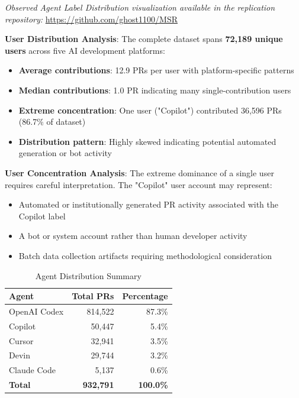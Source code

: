 \documentclass[conference]{IEEEtran}
\begin{document}
\noindent\textit{Observed Agent Label Distribution visualization available in the replication repository:} \url{https://github.com/ghost1100/MSR}

\textbf{User Distribution Analysis}: The complete dataset spans \textbf{72,189 unique users} across five AI development platforms:
\begin{itemize}
    \item \textbf{Average contributions}: 12.9 PRs per user with platform-specific patterns
    \item \textbf{Median contributions}: 1.0 PR indicating many single-contribution users  
    \item \textbf{Extreme concentration}: One user ("Copilot") contributed 36,596 PRs (86.7\% of dataset)
    \item \textbf{Distribution pattern}: Highly skewed indicating potential automated generation or bot activity
\end{itemize}

\textbf{User Concentration Analysis}: The extreme dominance of a single user requires careful interpretation. The "Copilot" user account may represent:
\begin{itemize}
    \item Automated or institutionally generated PR activity associated with the Copilot label
    \item A bot or system account rather than human developer activity
    \item Batch data collection artifacts requiring methodological consideration
\end{itemize}

\begin{table}[t]
\centering
\caption{Agent Distribution Summary}
\label{tab:agent_distribution}
\begin{tabular}{@{}lrr@{}}
\toprule
\textbf{Agent} & \textbf{Total PRs} & \textbf{Percentage} \\
\midrule
OpenAI Codex & 814,522 & 87.3\% \\
Copilot & 50,447 & 5.4\% \\
Cursor & 32,941 & 3.5\% \\
Devin & 29,744 & 3.2\% \\
Claude Code & 5,137 & 0.6\% \\
\midrule
\textbf{Total} & \textbf{932,791} & \textbf{100.0\%} \\
\bottomrule
\end{tabular}
\end{table}
\end{document}
